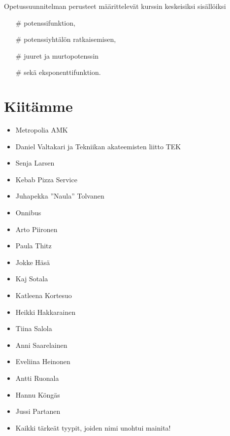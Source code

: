 Opetussuunnitelman perusteet määrittelevät kurssin keskeisiksi sisällöiksi
\begin{itemize}
\item[\#] potenssifunktion,
\item[\#] potenssiyhtälön ratkaisemisen,
\item[\#] juuret ja murtopotenssin
\item[\#] sekä eksponenttifunktion.
\end{itemize}

\section*{Kiitämme}
\begin{itemize}
\item Metropolia AMK
\item Daniel Valtakari ja Tekniikan akateemisten liitto TEK
\item Senja Larsen
\item Kebab Pizza Service
\item Juhapekka ''Naula'' Tolvanen
\item Onnibus
\item Arto Piironen
\item Paula Thitz
\item Jokke Häsä
\item Kaj Sotala
\item Katleena Kortesuo
\item Heikki Hakkarainen
\item Tiina Salola
\item Anni Saarelainen
\item Eveliina Heinonen
\item Antti Ruonala
\item Hannu Köngäs
\item Jussi Partanen
\item Kaikki tärkeät tyypit, joiden nimi unohtui mainita!
\end{itemize}


